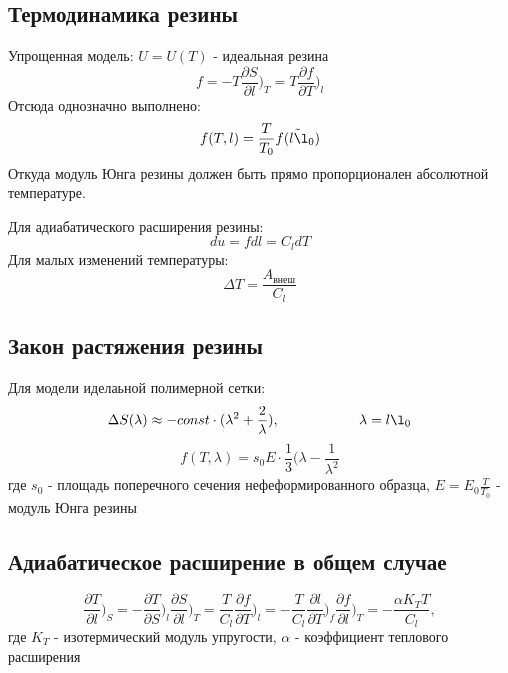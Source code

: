 \documentclass[a4paper,12pt]{article} %
\begin{document}
\subsection{Термодинамика резины}
Упрощенная модель: $U = U(T)$ - идеальная резина
\begin{equation}
f = -T\frac{\partial S}{\partial l})_T = T\frac{\partial f}{\partial T})_l
\end{equation}
Отсюда однозначно выполнено:
\begin{equation}
f(T, l) = \frac{T}{T_0}\tilde{f(l\l_0)}
\end{equation}
Откуда модуль Юнга резины должен быть прямо пропорционален абсолютной температуре.

Для адиабатического расширения резины:
\begin{equation}
du = fdl = C_ldT
\end{equation}
Для малых изменений температуры:
\begin{equation}
\Delta T = \frac{A_{внеш}}{C_l}
\end{equation}
\subsection{Закон растяжения резины}
Для модели иделаьной полимерной сетки:
\begin{equation}
\Delta S(\lambda) \approx -const \cdot (\lambda^2+\frac{2}{\lambda}), \hspace*{20mm} \lambda=l\l_0
\end{equation}
\begin{equation}
f(T, \lambda) = s_0E\cdot \frac{1}{3}(\lambda-\frac{1}{\lambda^2}
\end{equation}
где $s_0$ - площадь поперечного сечения нефеформированного образца, $E = E_0\frac{T}{T_0}$ - модуль Юнга резины
\subsection{Адиабатическое расширение в общем случае}
\begin{equation}
\frac{\partial T}{\partial l})_S = - \frac{\partial T}{\partial S})_l \frac{\partial S}{\partial l})_T = \frac{T}{C_l}\frac{\partial f}{\partial T})_l = -\frac{T}{C_l}\frac{\partial l}{\partial T})_f \frac{\partial f}{\partial l})_T =
-\frac{\alpha K_T T}{C_l},
\end{equation}
где $K_T$ - изотермический модуль упругости, $\alpha$ - коэффициент теплового расширения
\end{document}

